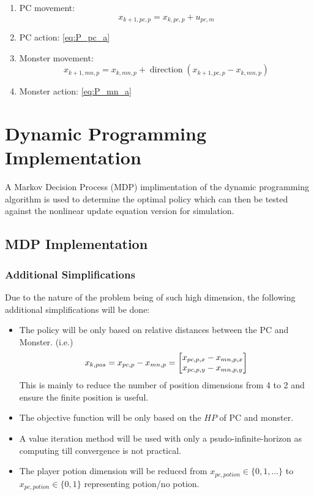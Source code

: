 \documentclass[letterpaper, 10 pt, conference]{ieeeconf}
\begin{document}
\begin{enumerate}
    \item PC movement: \[
        x_{k+1,pc,p} = x_{k,pc,p} + u_{pc,m}
    \]
    \item PC action: \eqref{eq:P_pc_a}
    \item Monster movement: \[
        x_{k+1,mn,p} = x_{k,mn,p} + \operatorname{direction}(x_{k+1,pc,p} - x_{k,mn,p})
    \]
    \item Monster action: \eqref{eq:P_mn_a}
\end{enumerate}

\section{Dynamic Programming Implementation}
A Markov Decision Process (MDP) implimentation of the dynamic programming algorithm is used to determine the optimal policy which can then be tested against the nonlinear update equation version for simulation.

\subsection{MDP Implementation}
\subsubsection{Additional Simplifications}
Due to the nature of the problem being of such high dimension, the following additional simplifications will be done:
\begin{itemize}
    \item The policy will be only based on relative distances between the PC and Monster. (i.e.) \[
        x_{k,pos} = x_{pc,p} - x_{mn,p} = \mqty[x_{pc,p,x} - x_{mn,p,x}\\ x_{pc,p,y} - x_{mn,p,y}]
    \]
    This is mainly to reduce the number of position dimensions from 4 to 2 and ensure the finite position is useful.
    \item The objective function will be only based on the $HP$ of PC and monster.
    \item A value iteration method will be used with only a psudo-infinite-horizon as computing till convergence is not practical.
    \item The player potion dimension will be reduced from $x_{pc,potion} \in \{0,1,\dots\}$ to $x_{pc,potion} \in \{0,1\}$ representing potion/no potion.
\end{itemize}
\end{document}
